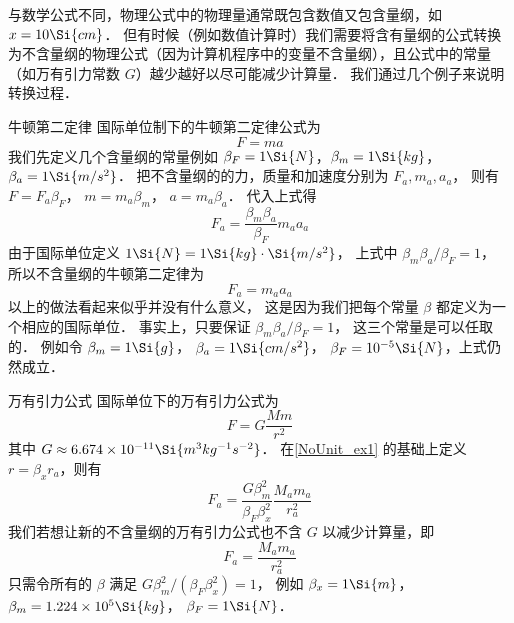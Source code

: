 

与数学公式不同，物理公式中的物理量通常既包含数值又包含量纲，如 $x = 10\Si{cm}$． 但有时候（例如数值计算时）我们需要将含有量纲的公式转换为不含量纲的物理公式（因为计算机程序中的变量不含量纲），且公式中的常量（如万有引力常数 $G$）越少越好以尽可能减少计算量． 我们通过几个例子来说明转换过程．

\begin{exam}{牛顿第二定律}\label{NoUnit_ex1}
国际单位制下的牛顿第二定律公式为
\begin{equation}
F = ma
\end{equation}
我们先定义几个含量纲的常量例如 $\beta_{F} = 1\Si{N}$，$\beta_{m} = 1\Si{kg}$，$\beta_{a} = 1\Si{m/s^2}$． 把不含量纲的的力，质量和加速度分别为 $F_a, m_a, a_a$， 则有 $F = F_a \beta_F$， $m = m_a \beta_{m}$， $a = m_a \beta_{a}$． 代入上式得
\begin{equation}
F_a = \frac{\beta_m \beta_a}{\beta_F} m_a  a_a
\end{equation}
由于国际单位定义 $1\Si{N} = 1\Si{kg}\cdot\Si{m/s^2}$， 上式中 $\beta_m \beta_a/\beta_F = 1$， 所以不含量纲的牛顿第二定律为
\begin{equation}\label{NoUnit_eq3}
F_a = m_a a_a
\end{equation}
以上的做法看起来似乎并没有什么意义， 这是因为我们把每个常量 $\beta$ 都定义为一个相应的国际单位． 事实上，只要保证 $\beta_m \beta_a/\beta_F = 1$， 这三个常量是可以任取的． 例如令 $\beta_m = 1\Si{g}$， $\beta_a = 1\Si{cm/s^2}$， $\beta_F = 10^{-5}\Si{N}$，上式仍然成立．
\end{exam}

\begin{exam}{万有引力公式}
国际单位下的万有引力公式为
\begin{equation}
F = G\frac{Mm}{r^2}
\end{equation}
其中 $G \approx 6.674\times 10^{-11} \Si{m^3 kg^{-1} s^{-2}}$． 在\autoref{NoUnit_ex1} 的基础上定义 $r = \beta_x r_a$，则有
\begin{equation}
F_a = \frac{G\beta_m^2}{\beta_F \beta_x^2} \frac{M_a m_a}{r_a^2}
\end{equation}
我们若想让新的不含量纲的万有引力公式也不含 $G$ 以减少计算量，即
\begin{equation}\label{NoUnit_eq6}
F_a = \frac{M_a m_a}{r_a^2}
\end{equation}
只需令所有的 $\beta$ 满足 $G\beta_m^2/(\beta_F\beta_x^2) = 1$， 例如 $\beta_x = 1\Si{m}$， $\beta_m = 1.224\times 10^5 \Si{kg}$， $\beta_F = 1\Si{N}$．
\end{exam}

